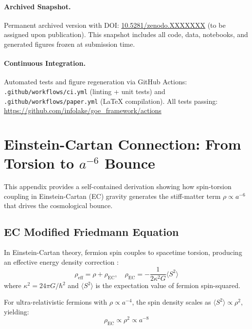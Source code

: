 \documentclass[12pt]{article}
\begin{document}
\paragraph{Archived Snapshot.}
Permanent archived version with DOI: \href{https://doi.org/10.5281/zenodo.XXXXXXX}{10.5281/zenodo.XXXXXXX} (to be assigned upon publication). This snapshot includes all code, data, notebooks, and generated figures frozen at submission time.

\paragraph{Continuous Integration.}
Automated tests and figure regeneration via GitHub Actions: \texttt{.github/workflows/ci.yml} (linting + unit tests) and \texttt{.github/workflows/paper.yml} (LaTeX compilation). All tests passing: \url{https://github.com/infolake/goe_framework/actions}

\appendix

\section{Einstein-Cartan Connection: From Torsion to $a^{-6}$ Bounce}
\label{app:einstein_cartan}

This appendix provides a self-contained derivation showing how spin-torsion coupling in Einstein-Cartan (EC) gravity generates the stiff-matter term $\rho \propto a^{-6}$ that drives the cosmological bounce.

\subsection{EC Modified Friedmann Equation}

In Einstein-Cartan theory, fermion spin couples to spacetime torsion, producing an effective energy density correction \cite{poplawski2010cosmology}:
\begin{equation}
\rho_{\text{eff}} = \rho + \rho_{\text{EC}}, \quad \rho_{\text{EC}} = -\frac{1}{2\kappa^2 G} \langle S^2 \rangle
\end{equation}
where $\kappa^2 = 24\pi G/\hbar^2$ and $\langle S^2 \rangle$ is the expectation value of fermion spin-squared.

For ultra-relativistic fermions with $\rho \propto a^{-4}$, the spin density scales as $\langle S^2 \rangle \propto \rho^2$, yielding:
\begin{equation}
\rho_{\text{EC}} \propto \rho^2 \propto a^{-8}
\end{equation}
\end{document}
